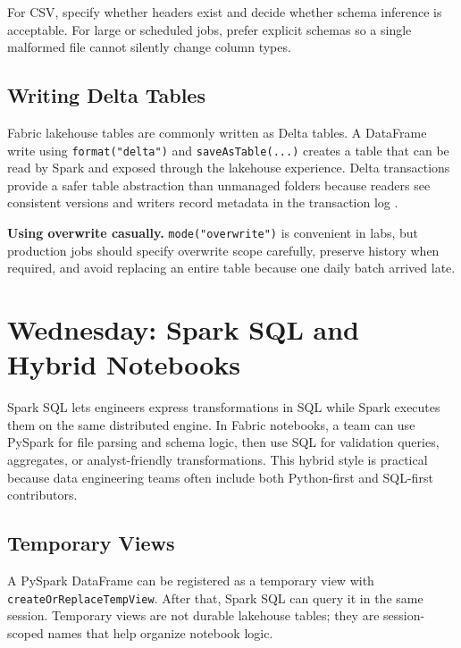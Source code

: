 \begin{tipbox}
For CSV, specify whether headers exist and decide whether schema inference is acceptable. For large or scheduled jobs, prefer explicit schemas so a single malformed file cannot silently change column types.
\end{tipbox}

\subsection{Writing Delta Tables}
Fabric lakehouse tables are commonly written as Delta tables. A DataFrame write using \texttt{format("delta")} and \texttt{saveAsTable(...)} creates a table that can be read by Spark and exposed through the lakehouse experience. Delta transactions provide a safer table abstraction than unmanaged folders because readers see consistent versions and writers record metadata in the transaction log \cite{armbrust2020delta,deltaLakeDocs}.

\begin{pitfall}
\textbf{Using overwrite casually.} \texttt{mode("overwrite")} is convenient in labs, but production jobs should specify overwrite scope carefully, preserve history when required, and avoid replacing an entire table because one daily batch arrived late.
\end{pitfall}

\section{Wednesday: Spark SQL and Hybrid Notebooks}
Spark SQL lets engineers express transformations in SQL while Spark executes them on the same distributed engine. In Fabric notebooks, a team can use PySpark for file parsing and schema logic, then use SQL for validation queries, aggregates, or analyst-friendly transformations. This hybrid style is practical because data engineering teams often include both Python-first and SQL-first contributors.

\subsection{Temporary Views}
A PySpark DataFrame can be registered as a temporary view with \texttt{createOrReplaceTempView}. After that, Spark SQL can query it in the same session. Temporary views are not durable lakehouse tables; they are session-scoped names that help organize notebook logic.

